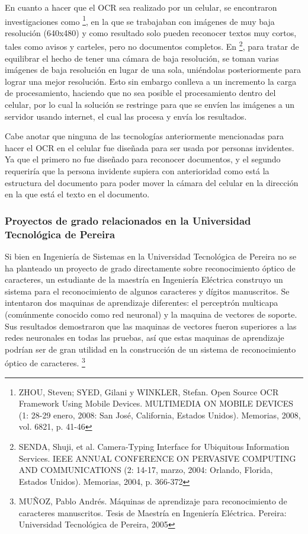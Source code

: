 \documentclass[a4paper, 11pt, oneside]{article}
\begin{document}
	En cuanto a hacer que el OCR sea realizado por un celular, se encontraron investigaciones
	como \footnote{ZHOU, Steven; SYED, Gilani y WINKLER, Stefan. Open Source OCR Framework Using
    Mobile Devices. MULTIMEDIA ON MOBILE DEVICES (1: 28-29 enero, 2008: San José, California, Estados 
    Unidos). Memorias, 2008, vol. 6821, p. 41-46}, en la que se trabajaban con imágenes de muy baja 
    resolución (640x480) y como resultado solo pueden reconocer textos muy cortos, tales como avisos 
    y carteles, pero no documentos completos. En \footnote{SENDA, Shuji, et al. Camera-Typing Interface
    for Ubiquitous Information Services. IEEE ANNUAL CONFERENCE ON PERVASIVE COMPUTING AND COMMUNICATIONS
    (2: 14-17, marzo, 2004: Orlando, Florida, Estados Unidos). Memorias, 2004, p. 366-372}, para tratar 
    de equilibrar el hecho de tener una cámara de baja resolución, se toman varias imágenes de baja 
    resolución en lugar de una sola, uniéndolas posteriormente para lograr una mejor resolución. Esto sin 
    embargo conlleva a un incremento la carga de procesamiento, haciendo que no sea posible el procesamiento 
    dentro del celular, por lo cual la solución se restringe para que se envíen las imágenes a un servidor 
    usando internet, el cual las procesa y envía los resultados.

	Cabe anotar que ninguna de las tecnologías anteriormente mencionadas para hacer
	el OCR en el celular fue diseñada para ser usada por personas invidentes. Ya que el 
	primero no fue diseñado para reconocer documentos, y el segundo requeriría que la persona
	invidente supiera con anterioridad como está la estructura del documento para poder mover
	la cámara del celular en la dirección en la que está el texto en el documento.
	
	\subsubsection{Proyectos de grado relacionados en la Universidad Tecnológica de Pereira}
	Si bien en Ingeniería de Sistemas en la Universidad Tecnológica de Pereira no se ha planteado un 
    proyecto de grado directamente sobre reconocimiento óptico de caracteres, un estudiante de la 
    maestría en Ingeniería Eléctrica construyo un sistema para el reconocimiento de algunos 
    caracteres y dígitos manuscritos. Se intentaron dos maquinas de aprendizaje diferentes:
	el perceptrón multicapa (comúnmente conocido como red neuronal) y la maquina de vectores de
	soporte. Sus resultados demostraron que las maquinas de vectores fueron superiores a las redes
    neuronales en todas las pruebas, así que estas maquinas de aprendizaje podrían ser de gran 
    utilidad en la construcción de un sistema de reconocimiento óptico de caracteres. \footnote{MUÑOZ, 
    Pablo Andrés. Máquinas de aprendizaje para reconocimiento de caracteres manuscritos. Tesis de 
    Maestría en Ingeniería Eléctrica. Pereira: Universidad Tecnológica de Pereira, 2005}
\end{document}

